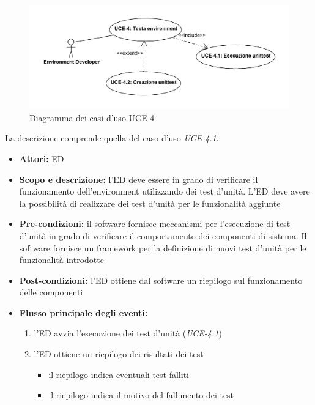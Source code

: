 
\begin{figure}
\centering
\includegraphics[width=1.1\textwidth]{Immagini/Capitolo2/UseCases/UCE-4.png}
\caption{Diagramma dei casi d'uso UCE-4}\label{fig:uc-uce-4}
\end{figure}

La descrizione comprende quella del caso d'uso \emph{UCE-4.1}.

\begin{itemize}
	\item \textbf{Attori:} ED
	\item \textbf{Scopo e descrizione:} l'ED deve essere in grado di verificare il funzionamento dell'environment utilizzando dei test d'unità. L'ED deve avere la possibilità di realizzare dei test d'unità per le funzionalità aggiunte
	\item \textbf{Pre-condizioni:} il software fornisce meccanismi per l'esecuzione di test d'unità in grado di verificare il comportamento dei componenti di sistema. Il software fornisce un framework per la definizione di nuovi test d'unità per le funzionalità introdotte
	\item \textbf{Post-condizioni:} l'ED ottiene dal software un riepilogo sul funzionamento delle componenti
	\item \textbf{Flusso principale degli eventi:}
		\begin{enumerate}
			\item l'ED avvia l'esecuzione dei test d'unità (\emph{UCE-4.1})
			\item l'ED ottiene un riepilogo dei risultati dei test
				\begin{itemize}
					\item il riepilogo indica eventuali test falliti
					\item il riepilogo indica il motivo del fallimento dei test
				\end{itemize}
		\end{enumerate}
\end{itemize}


